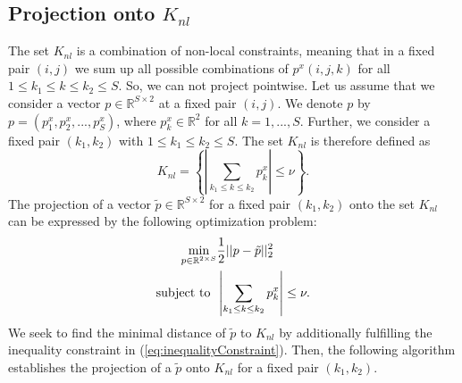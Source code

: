 \documentclass[abstracton]{scrreprt}
\begin{document}
        \subsection{Projection onto $K_{nl}$}
            \label{sub:projection_onto_K_nl}
            The set $K_{nl}$ is a combination of non-local constraints, meaning that in a fixed pair $(i,j)$ we sum up all possible combinations of $p^{x}(i,j,k)$ for all $1 \le k_{1} \le k \le k_{2} \le S$. So, we can not project pointwise. Let us assume that we consider a vector $p \in \mathbb{R}^{S \times 2}$ at a fixed pair $(i,j)$. We denote $p$ by $p = (p^{x}_{1}, p^{x}_{2}, ..., p^{x}_{S})$, where $p^{x}_{k} \in \mathbb{R}^{2}$ for all $k = 1, ..., S$. Further, we consider a fixed pair $(k_{1}, k_{2})$ with $1 \le k_{1} \le k_{2} \le S$. The set $K_{nl}$ is therefore defined as
                $$
                    K_{nl} = \left\{ \left| \sum_{k_{1} \le k \le k_{2}} p^{x}_{k} \right| \le \nu \right\}.
                $$
            The projection of a vector $\tilde{p} \in \mathbb{R}^{S \times 2}$ for a fixed pair $(k_{1}, k_{2})$ onto the set $K_{nl}$ can be expressed by the following optimization problem:
                \begin{subequations}
                    \begin{align}
                    \min\limits_{p \in \mathbb{R}^{2 \times S}} &\frac{1}{2} ||p - \tilde{p}||^{2}_{2} \label{eq:equalityConstraint} \\
                    \textnormal{subject to} \,\,\, &\left| \sum_{k_{1} \le k \le k_{2}} p^{x}_{k} \right| \le \nu. \label{eq:inequalityConstraint}
                    \end{align}
                    \label{eq:optimization_problem}
                \end{subequations}
            We seek to find the minimal distance of $\tilde{p}$ to $K_{nl}$ by additionally fulfilling the inequality constraint in (\ref{eq:inequalityConstraint}). Then, the following algorithm establishes the projection of a $\tilde{p}$ onto $K_{nl}$ for a fixed pair $(k_{1}, k_{2})$.
\end{document}
